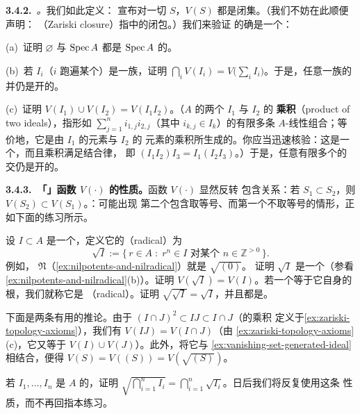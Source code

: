 \textbf{3.4.2.}\ \emph{\trhDefinition{}。}\quad 我们如此定义\textbf{\trZariskiTopology}：
宣布对一切 $S$，$V(S)$ 都是闭集。（我们不妨在此顺便声明：\textbf{\trZariskiClosure{}}
（Zariski closure）指\trZariskiTopology{}中的闭包。）我们来验证\trZariskiTopology{}
的确是一个\trTopology：

\begin{exercise}\label{ex:zariski-topology-axioms}
(a)~证明 $\varnothing$ 与 $\operatorname{Spec} A$ 都是 $\operatorname{Spec} A$ 的\trOpenSubset。

(b)~若 $I_i$（$i$ 跑遍某个\trIndexSet）是一族\trIdeal，证明
$\bigcap_i V(I_i)=V\bigl(\sum_i I_i\bigr)$。于是，任意一族\trOpenSet{}的并仍是开的。

(c)~证明 $V(I_1)\cup V(I_2)=V(I_1I_2)$。（$A$ 的两个\trIdeal{} $I_1$ 与 $I_2$ 的%
\textbf{乘积}（product of two ideals），指形如 $\sum_{j=1}^{n}i_{1,j}i_{2,j}$（其中
$i_{k,j}\in I_k$）的有限多条 $A$-线性组合；等价地，它是由 $I_1$ 的元素与 $I_2$ 的
元素的乘积所生成的\trIdeal。你应当迅速核验：这是一个\trIdeal，而且乘积满足结合律，
即 $(I_1I_2)I_3=I_1(I_2I_3)$。）于是，任意有限多个\trOpenSet{}的交仍是开的。
\end{exercise}

\textbf{3.4.3.\ 「\trVanishingSet{}」函数 $V(\cdot)$ 的性质。}\quad 函数 $V(\cdot)$ 显然反转
包含关系：若 $S_1\subset S_2$，则 $V(S_2)\subset V(S_1)$。\trhWarning：可能出现
第二个包含取等号、而第一个不取等号的情形，正如下面的练习所示。

\begin{exercise}[练习兼定义]\label{ex:radical-of-an-ideal}
设 $I\subset A$ 是一个\trIdeal，定义它的\textbf{\trRadical}（radical）为
\[
\sqrt{I}:=\{\, r\in A \;:\; r^n\in I \text{ 对某个 } n\in\mathbb{Z}^{>0} \,\}.
\]
例如，\trNilradical{} $\mathfrak{N}$（\cref{ex:nilpotents-and-nilradical}）就是 $\sqrt{(0)}$。
证明 $\sqrt{I}$ 是一个\trIdeal（参看\cref{ex:nilpotents-and-nilradical}(b)）。证明
$V(\sqrt{I})=V(I)$。若一个\trIdeal{}等于它自身的根，我们就称它是\textbf{\trRadicalIdeal{}}
（radical）。证明 $\sqrt{\sqrt{I}}=\sqrt{I}$，并且\trPrimeIdeal{}都是\trRadicalIdeal{}。
\end{exercise}

下面是两条有用的推论。由于 $(I\cap J)^2\subset IJ\subset I\cap J$（\trIdeal{}的乘积
定义于\cref{ex:zariski-topology-axioms}），我们有 $V(IJ)=V(I\cap J)$（由%
\cref{ex:zariski-topology-axioms}(c)，它又等于 $V(I)\cup V(J)$）。此外，将它与%
\cref{ex:vanishing-set-generated-ideal}相结合，便得
$V(S)=V((S))=V(\sqrt{(S)})$。

\begin{exercise}[练习：根与有限交交换]\label{ex:radicals-finite-intersections}
若 $I_1,\dots,I_n$ 是\trRing{} $A$ 的\trIdeal，证明
$\sqrt{\bigcap_{i=1}^{n}I_i}=\bigcap_{i=1}^{n}\sqrt{I_i}$。日后我们将反复使用这条
性质，而不再回指本练习。
\end{exercise}


